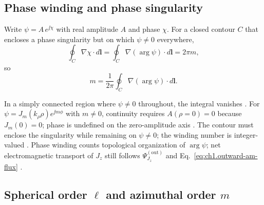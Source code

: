 
\subsection{Phase winding and phase singularity}
\label{sec:ch01.2.8}

Write $\psi=A\,e^{\jj\chi}$ with real amplitude $A$ and phase $\chi$. For a closed contour $C$ that encloses a phase singularity but on which $\psi\neq 0$ everywhere,
\begin{equation}
\label{eq:ch1.phase-winding}
\oint_C \nabla\chi\cdot d\mathbf{l}
=\oint_C \nabla(\arg\psi)\cdot d\mathbf{l}
=2\pi m,
\end{equation}
so
\begin{equation}
\label{eq:ch1.m-winding-integral}
m=\frac{1}{2\pi}\oint_C \nabla(\arg\psi)\cdot d\mathbf{l}.
\end{equation}
\addtocounter{equation}{-1}\label{eq:ch1.phase-winding-number}%
\addtocounter{equation}{-1}\label{eq:ch1.lg-vortex-field}%
In a simply connected region where $\psi\neq 0$ throughout, the integral vanishes \cite{nye1999}. For $\psi=J_m(k_\rho\rho)e^{\jj m\phi}$ with $m\neq 0$, continuity requires $A(\rho=0)=0$ because $J_m(0)=0$; phase is undefined on the zero-amplitude axis \cite{stratton1941,nye1999}. The contour must enclose the singularity while remaining on $\psi\neq 0$; the winding number is integer-valued \cite{nye1999}. Phase winding counts topological organization of $\arg\psi$; net electromagnetic transport of $J_z$ still follows $\Psi_{J_z}^{\mathrm{(out)}}$ and Eq.~\eqref{eq:ch1.outward-am-flux} \cite{beth1936,stratton1941}.


\subsection{Spherical order $\ell$ and azimuthal order $m$}
\label{sec:ch01.2.9}

